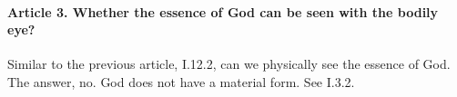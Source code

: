 \documentclass{ucetd}
\begin{document}
\paragraph{Article 3. Whether the essence of God can be seen with the bodily eye?}
Similar to the previous article, I.12.2, can we physically see the essence of God. The answer, no. God does not have a material form. See I.3.2.
\end{document}
